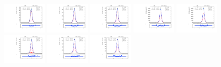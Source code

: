 \begin{figure}[htb]
\centering
\includegraphics[width=0.19\textwidth]{plots/Appendix_Recoil_Fits/ZmmData_PF_13TeV_2G_bkg/pfu1fit_0.pdf}
\includegraphics[width=0.19\textwidth]{plots/Appendix_Recoil_Fits/ZmmData_PF_13TeV_2G_bkg/pfu1fit_1.pdf}
\includegraphics[width=0.19\textwidth]{plots/Appendix_Recoil_Fits/ZmmData_PF_13TeV_2G_bkg/pfu1fit_2.pdf}
\includegraphics[width=0.19\textwidth]{plots/Appendix_Recoil_Fits/ZmmData_PF_13TeV_2G_bkg/pfu1fit_3.pdf}
\includegraphics[width=0.19\textwidth]{plots/Appendix_Recoil_Fits/ZmmData_PF_13TeV_2G_bkg/pfu1fit_4.pdf}
\includegraphics[width=0.19\textwidth]{plots/Appendix_Recoil_Fits/ZmmData_PF_13TeV_2G_bkg/pfu1fit_5.pdf}
\includegraphics[width=0.19\textwidth]{plots/Appendix_Recoil_Fits/ZmmData_PF_13TeV_2G_bkg/pfu1fit_6.pdf}
\includegraphics[width=0.19\textwidth]{plots/Appendix_Recoil_Fits/ZmmData_PF_13TeV_2G_bkg/pfu1fit_7.pdf}

\end{figure}
